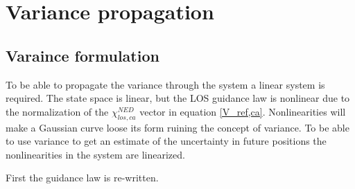 \section{Variance propagation}

\subsection{Varaince formulation}

To be able to propagate the variance through the system a linear system is required. The state space is linear, but the LOS guidance law is nonlinear due to the normalization of the $\chi^{NED}_{los,ca}$ vector in equation \ref{V_ref,ca}. Nonlinearities will make a Gaussian curve loose its form ruining the concept of variance. To be able to use variance to get an estimate of the uncertainty in future positions the nonlinearities in the system are linearized.

First the guidance law is re-written.

